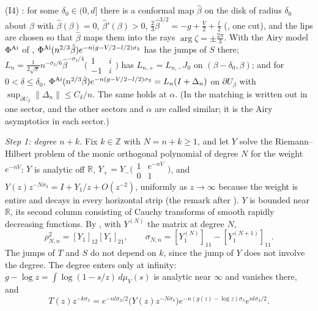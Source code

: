 \documentclass[11pt]{amsart}
\theoremstyle{definition}
\theoremstyle{remark}
\numberwithin{equation}{section}
\newcommand{\R}{\mathbb{R}}
\newcommand{\Z}{\mathbb{Z}}
\begin{document}
(I4) \cite[(9.4)--(9.37)]{Bl}: for some $\delta_0\in(0,d]$ there is a conformal map $\hat\beta$ on the disk of radius $\delta_0$ about $\beta$ with $\hat\beta(\beta)=0$, $\hat\beta'(\beta)>0$, $\frac23\hat\beta^{3/2}=-g+\frac V2+\frac l2$ (\cite[(9.35)]{Bl}, one cut), and the lips are chosen so that $\hat\beta$ maps them into the rays $\arg\zeta=\pm\frac{2\pi}3$. With the Airy model $\Phi^{\rm Ai}$ of \cite[(9.18)--(9.20)]{Bl}, $\Phi^{\rm Ai}(n^{2/3}\hat\beta)e^{-n(g-V/2-l/2)\sigma_3}$ has the jumps of $S$ there; $L_n=\frac1{2\sqrt\pi}n^{-\sigma_3/6}\hat\beta^{-\sigma_3/4}\bigl(\begin{smallmatrix}1&i\\-1&i\end{smallmatrix}\bigr)$ has $L_{n,+}=L_{n,-}J_0$ on $(\beta-\delta_0,\beta)$; and for $0<\delta\le\delta_0$, $\Phi^{\rm Ai}(n^{2/3}\hat\beta)e^{-n(g-V/2-l/2)\sigma_3}=L_n(I+\Delta_n)$ on $\partial U_\beta$ with $\sup_{\partial U_\beta}\|\Delta_n\|\le C_\delta/n$. The same holds at $\alpha$. (In \cite{Bl} the matching is written out in one sector, and the other sectors and $\alpha$ are called similar; it is the Airy asymptotics \cite[(9.15)]{Bl} in each sector.)

\emph{Step 1: degree $n+k$.} Fix $k\in\Z$ with $N=n+k\ge1$, and let $Y$ solve the Riemann--Hilbert problem \cite[\S3, (3.7)--(3.11)]{Bl} of the monic orthogonal polynomial of degree $N$ for the weight $e^{-nV}$: $Y$ is analytic off $\R$, $Y_+=Y_-\bigl(\begin{smallmatrix}1&e^{-nV}\\0&1\end{smallmatrix}\bigr)$, and $Y(z)z^{-N\sigma_3}=I+Y_1/z+O(z^{-2})$, uniformly as $z\to\infty$ because the weight is entire and decays in every horizontal strip (the remark after \cite[(3.6)]{Bl}). $Y$ is bounded near $\R$, its second column consisting of Cauchy transforms of smooth rapidly decreasing functions. By \cite[(3.17), (3.21)--(3.23)]{Bl}, with $Y^{(N)}$ the matrix at degree $N$,
\begin{equation}\label{eq:rc-Y1}
\rho_{N,n}^2=[Y_1]_{12}[Y_1]_{21},\qquad\sigma_{N,n}=[Y_1^{(N)}]_{11}-[Y_1^{(N+1)}]_{11}.
\end{equation}
The jumps of $T$ and $S$ do not depend on $k$, since the jump of $Y$ does not involve the degree. The degree enters only at infinity: $g-\log z=\int\log(1-s/z)\,d\mu_V(s)$ is analytic near $\infty$ and vanishes there, and
\begin{equation}\label{eq:rc-Tinf}
T(z)z^{-k\sigma_3}=e^{-nl\sigma_3/2}\bigl(Y(z)z^{-N\sigma_3}\bigr)e^{-n(g(z)-\log z)\sigma_3}e^{nl\sigma_3/2}.
\end{equation}
\end{document}
